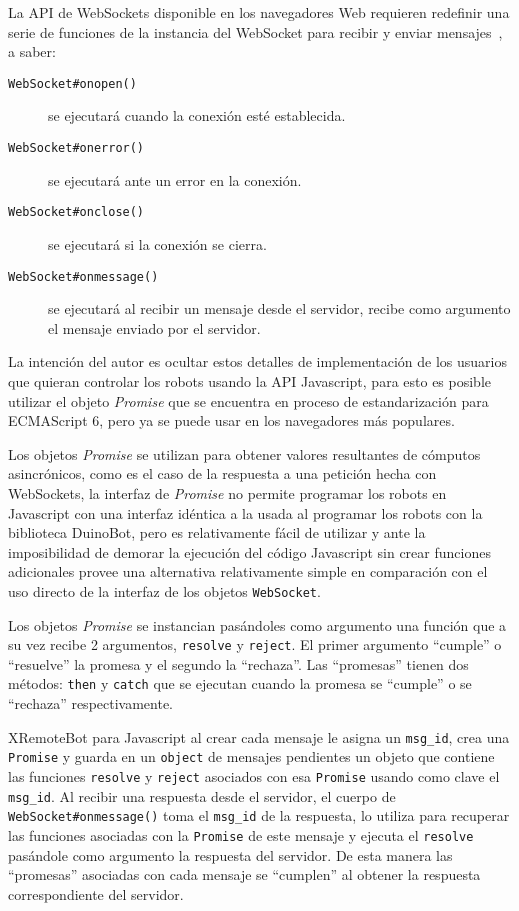 La API de WebSockets disponible en los navegadores Web requieren
redefinir una serie de funciones de la instancia del WebSocket
para recibir y enviar mensajes~\citep{websocket_2014}, a saber:
\begin{description}
    \item[\texttt{WebSocket\#onopen()}] se ejecutará cuando
    la conexión esté establecida.
    \item[\texttt{WebSocket\#onerror()}] se ejecutará ante un error en
    la conexión.
    \item[\texttt{WebSocket\#onclose()}] se ejecutará si la conexión
    se cierra.
    \item[\texttt{WebSocket\#onmessage()}] se ejecutará al recibir un
    mensaje desde el servidor, recibe como argumento el mensaje
    enviado por el servidor.
\end{description}

La intención del autor es ocultar estos detalles de implementación de
los usuarios que quieran controlar los robots usando la API Javascript,
para esto es posible utilizar el objeto \textit{Promise} que se encuentra
en proceso de estandarización para ECMAScript 6, pero ya se puede
usar en los navegadores más populares.

Los objetos \textit{Promise} se utilizan para obtener valores resultantes
de cómputos asincrónicos, como es el caso de la respuesta a una petición
hecha con WebSockets, la interfaz de \textit{Promise} no permite programar
los robots en Javascript con una interfaz idéntica a la usada al programar
los robots con la biblioteca DuinoBot, pero es relativamente fácil de
utilizar y ante la imposibilidad de demorar la ejecución del código
Javascript sin crear funciones adicionales provee una alternativa
relativamente simple en comparación con el uso directo de la interfaz
de los objetos \texttt{WebSocket}.

Los objetos \textit{Promise} se instancian pasándoles como argumento una
función que a su vez recibe 2 argumentos, \texttt{resolve} y \texttt{reject}.
El primer argumento ``cumple'' o ``resuelve'' la promesa y el segundo la
``rechaza''.
Las ``promesas'' tienen dos métodos: \texttt{then} y \texttt{catch} que se
ejecutan cuando la promesa se ``cumple'' o se ``rechaza'' respectivamente.

XRemoteBot para Javascript al crear cada mensaje le asigna un \texttt{msg\_id},
crea una \texttt{Promise} y guarda en un \texttt{object} de mensajes
pendientes un objeto que contiene las funciones \texttt{resolve} y
\texttt{reject} asociados con esa \texttt{Promise}
usando como clave el \texttt{msg\_id}. Al recibir una respuesta
desde el servidor, el cuerpo de \texttt{WebSocket\#onmessage()} toma el
\texttt{msg\_id} de la respuesta, lo utiliza para recuperar las funciones
asociadas con la \texttt{Promise} de este mensaje y ejecuta el
\texttt{resolve} pasándole como argumento la respuesta del servidor.
De esta manera las ``promesas'' asociadas con cada
mensaje se ``cumplen'' al obtener la respuesta correspondiente del servidor.

